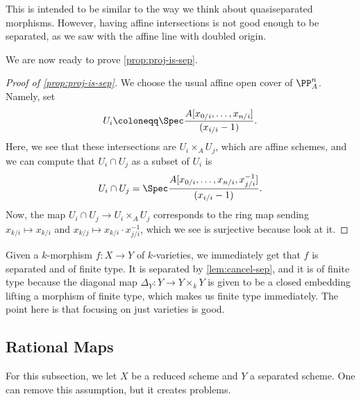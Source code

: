 \documentclass[../notes.tex]{subfiles}
\begin{document}
\begin{remark}
	This is intended to be similar to the way we think about quasiseparated morphisms. However, having affine intersections is not good enough to be separated, as we saw with the affine line with doubled origin.
\end{remark}
We are now ready to prove \autoref{prop:proj-is-sep}.
\begin{proof}[Proof of \autoref{prop:proj-is-sep}]
	We choose the usual affine open cover of $\PP^n_A$. Namely, set
	\[U_i\coloneqq\Spec\frac{A[x_{0/i},\ldots,x_{n/i}]}{(x_{i/i}-1)}.\]
	Here, we see that these intersections are $U_i\times_AU_j$, which are affine schemes, and we can compute that $U_i\cap U_j$ as a subset of $U_i$ is
	\[U_i\cap U_j=\Spec\frac{A[x_{0/i},\ldots,x_{n/i},x_{j/i}^{-1}]}{(x_{i/i}-1)}.\]
	Now, the map $U_i\cap U_j\to U_i\times_AU_j$ corresponds to the ring map sending $x_{k/i}\mapsto x_{k/i}$ and $x_{k/j}\mapsto x_{k/i}\cdot x_{j/i}^{-1}$, which we see is surjective because look at it.
\end{proof}
\begin{remark}
	Given a $k$-morphism $f\colon X\to Y$ of $k$-varieties, we immediately get that $f$ is separated and of finite type. It is separated by \autoref{lem:cancel-sep}, and it is of finite type because the diagonal map $\Delta_Y\colon Y\to Y\times_kY$ is given to be a closed embedding lifting a morphism of finite type, which makes us finite type immediately. The point here is that focusing on just varieties is good.
\end{remark}

\subsection{Rational Maps}
For this subsection, we let $X$ be a reduced scheme and $Y$ a separated scheme. One can remove this assumption, but it creates problems.
\end{document}
